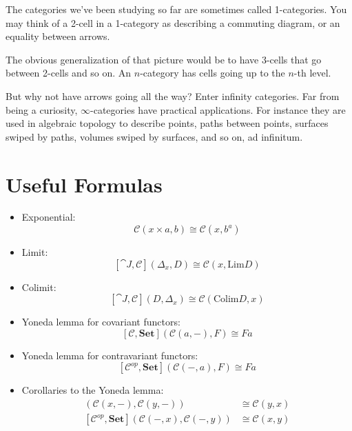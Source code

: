 \documentclass[DaoFP]{subfiles}
\begin{document}
The categories we've been studying so far are sometimes called 1-categories. You may think of a 2-cell in a 1-category as describing a commuting diagram, or an equality between arrows.

The obvious generalization of that picture would be to have 3-cells that go between 2-cells and so on. An $n$-category has cells going up to the $n$-th level. 

But why not have arrows going all the way? Enter infinity categories. Far from being a curiosity, $\infty$-categories have practical applications. For instance they are used in algebraic topology to describe points, paths between points, surfaces swiped by paths, volumes swiped by surfaces, and so on, ad infinitum. 

\section{Useful Formulas}
\begin{itemize}
\item Exponential:
\[\mathcal{C}(x \times a, b) \cong \mathcal{C}(x, b^a)\]
\item Limit:
\[ [\cat J, \mathcal{C}](\Delta_x, D)  \cong \mathcal{C}(x, \text{Lim}D) \]
\item Colimit:
\[ [\cat J, \mathcal{C}](D, \Delta_x)  \cong \mathcal{C}( \text{Colim}D, x) \]
\item Yoneda lemma for covariant functors:
\[ [\mathcal{C}, \mathbf{Set}]( \mathcal{C}(a, -), F) \cong F a \]
\item Yoneda lemma for contravariant functors:
\[ [\mathcal{C}^{op}, \mathbf{Set}]( \mathcal{C}(-, a), F) \cong F a \]
\item Corollaries to the Yoneda lemma:
\begin{align*}
 [\mathcal{C}, \mathbf{Set}]( \mathcal{C}(x, -), \mathcal{C}(y, -)) &\cong \mathcal{C}(y, x) \\
 [\mathcal{C}^{op}, \mathbf{Set}]( \mathcal{C}(-, x), \mathcal{C}(-, y)) &\cong \mathcal{C}(x, y)
\end{align*}

\end{itemize}
\end{document}

